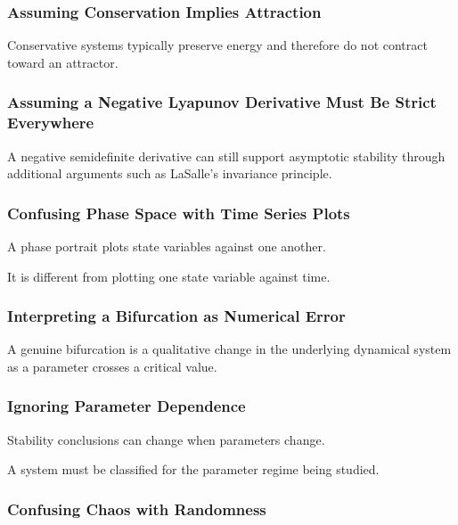 \subsubsection{Assuming Conservation Implies Attraction}

Conservative systems typically preserve energy and therefore do not
contract toward an attractor.

\subsubsection{Assuming a Negative Lyapunov Derivative Must Be Strict Everywhere}

A negative semidefinite derivative can still support asymptotic stability
through additional arguments such as LaSalle's invariance principle.

\subsubsection{Confusing Phase Space with Time Series Plots}

A phase portrait plots state variables against one another.

It is different from plotting one state variable against time.

\subsubsection{Interpreting a Bifurcation as Numerical Error}

A genuine bifurcation is a qualitative change in the underlying
dynamical system as a parameter crosses a critical value.

\subsubsection{Ignoring Parameter Dependence}

Stability conclusions can change when parameters change.

A system must be classified for the parameter regime being studied.

\subsubsection{Confusing Chaos with Randomness}

